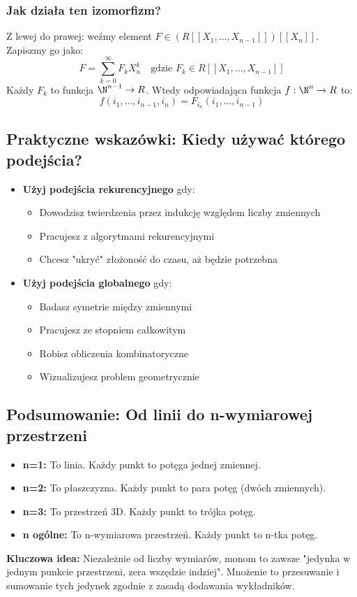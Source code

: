 \subsubsection*{Jak działa ten izomorfizm?}

Z lewej do prawej: weźmy element $F \in (R[[X_1,\dots,X_{n-1}]])[[X_n]]$. Zapiszmy go jako:
\[
F = \sum_{k=0}^\infty F_k X_n^k \quad \text{gdzie } F_k \in R[[X_1,\dots,X_{n-1}]]
\]
Każdy $F_k$ to funkcja $\N^{n-1} \to R$. Wtedy odpowiadająca funkcja $f: \N^n \to R$ to:
\[
f(i_1,\dots,i_{n-1}, i_n) = F_{i_n}(i_1,\dots,i_{n-1})
\]

\subsection{Praktyczne wskazówki: Kiedy używać którego podejścia?}

\begin{itemize}
\item \textbf{Użyj podejścia rekurencyjnego} gdy:
  \begin{itemize}
  \item Dowodzisz twierdzenia przez indukcję względem liczby zmiennych
  \item Pracujesz z algorytmami rekurencyjnymi
  \item Chcesz "ukryć" złożoność do czasu, aż będzie potrzebna
  \end{itemize}

\item \textbf{Użyj podejścia globalnego} gdy:
  \begin{itemize}
  \item Badasz symetrie między zmiennymi
  \item Pracujesz ze stopniem całkowitym
  \item Robisz obliczenia kombinatoryczne
  \item Wizualizujesz problem geometrycznie
  \end{itemize}
\end{itemize}

\subsection*{Podsumowanie: Od linii do n-wymiarowej przestrzeni}

\begin{itemize}
\item \textbf{n=1:} To linia. Każdy punkt to potęga jednej zmiennej.
\item \textbf{n=2:} To płaszczyzna. Każdy punkt to para potęg (dwóch zmiennych).
\item \textbf{n=3:} To przestrzeń 3D. Każdy punkt to trójka potęg.
\item \textbf{n ogólne:} To n-wymiarowa przestrzeń. Każdy punkt to n-tka potęg.
\end{itemize}

\noindent
\textbf{Kluczowa idea:} Niezależnie od liczby wymiarów, monom to zawsze "jedynka w jednym punkcie przestrzeni, zera wszędzie indziej". Mnożenie to przesuwanie i sumowanie tych jedynek zgodnie z zasadą dodawania wykładników.


